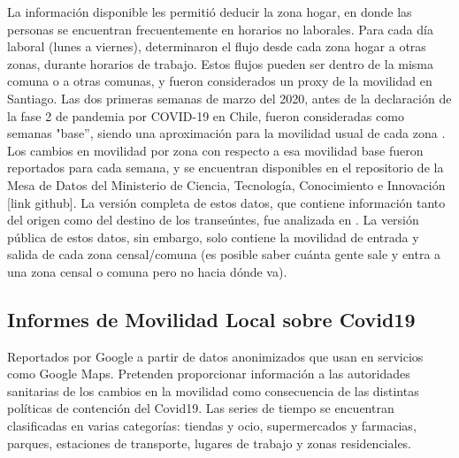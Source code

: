 La información disponible les permitió deducir la zona hogar, en donde las personas se encuentran frecuentemente en horarios no laborales. Para cada día laboral (lunes a viernes), determinaron el flujo desde cada zona hogar a otras zonas, durante horarios de trabajo. Estos flujos pueden ser dentro de la misma comuna o a otras comunas, y fueron considerados un proxy de la movilidad en Santiago. %
Las dos primeras semanas de marzo del 2020, antes de la declaración de la fase 2 de pandemia por COVID-19 en Chile, fueron consideradas como semanas "base”, siendo una aproximación para la movilidad usual de cada zona \cite{Olivares2020}. Los cambios en movilidad por zona con respecto a esa movilidad base fueron reportados para cada semana, y se encuentran disponibles en el repositorio de la Mesa de Datos del Ministerio de Ciencia, Tecnología, Conocimiento e Innovación [link github]. 
La versión completa de estos datos, que contiene información tanto del origen como del destino de los transeúntes, fue analizada en \cite{Carranza2020}. La versión pública de estos datos, sin embargo, solo contiene la movilidad de entrada y salida de cada zona censal/comuna (es posible saber cuánta gente sale y entra a una zona censal o comuna pero no hacia dónde va). 


\subsection{Informes de Movilidad Local sobre Covid19}

Reportados por Google a partir de datos anonimizados que usan en servicios como Google Maps. Pretenden proporcionar información a las autoridades sanitarias de los cambios en la movilidad como consecuencia de las distintas políticas de contención del Covid19. Las series de tiempo se encuentran clasificadas en varias categorías: tiendas y ocio, supermercados y farmacias, parques, estaciones de transporte, lugares de trabajo y zonas residenciales.


